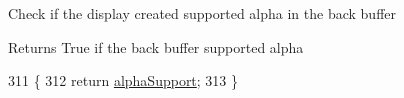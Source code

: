 Check if the display created supported alpha in the back buffer

\begin{DoxyReturn}{Returns}
True if the back buffer supported alpha 
\end{DoxyReturn}

\begin{DoxyCode}
311                                                  \{
312          \textcolor{keywordflow}{return} \mbox{\hyperlink{classorg_1_1newdawn_1_1slick_1_1_applet_game_container_a975d5cbb1d3d12649282b6ab406dafce}{alphaSupport}};
313       \}
\end{DoxyCode}
